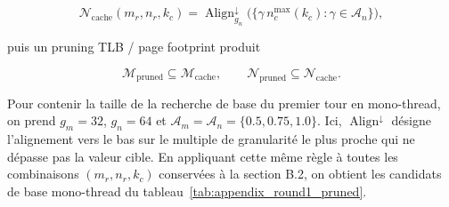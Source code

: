 \documentclass[a4paper,11pt,oneside]{article}
\begin{document}
$$
\mathcal{N}_{\text{cache}}(m_r,n_r,k_c)
= \operatorname{Align}^{\downarrow}_{g_n}\bigl(\{\gamma\, n_c^{\max}(k_c) : \gamma \in \mathcal{A}_n\}\bigr),
$$

puis un pruning TLB / page footprint produit

$$
\mathcal{M}_{\text{pruned}} \subseteq \mathcal{M}_{\text{cache}},
\qquad
\mathcal{N}_{\text{pruned}} \subseteq \mathcal{N}_{\text{cache}}.
$$

Pour contenir la taille de la recherche de base du premier tour en mono-thread, on prend $g_m=32$, $g_n=64$ et $\mathcal{A}_m=\mathcal{A}_n=\{0.5,0.75,1.0\}$. Ici, $\operatorname{Align}^{\downarrow}$ désigne l'alignement vers le bas sur le multiple de granularité le plus proche qui ne dépasse pas la valeur cible. En appliquant cette même règle à toutes les combinaisons $(m_r,n_r,k_c)$ conservées à la section B.2, on obtient les candidats de base mono-thread du tableau~\ref{tab:appendix_round1_pruned}.
\end{document}
